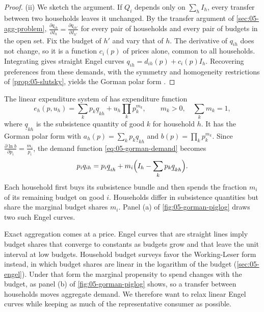 \begin{proof}
(ii) We sketch the argument. If $Q_i$ depends only on $\sum_h I_h$, every transfer between two
households leaves it unchanged. By the transfer argument of \cref{sec:05-agg-problem},
$\frac{\partial q_{ih}}{\partial I_h} = \frac{\partial q_{ih'}}{\partial I_{h'}}$ for every pair of
households and every pair of budgets in the open set. Fix the budget of $h'$ and vary that of $h$. The
derivative of $q_{ih}$ does not change, so it is a function $c_i(p)$ of prices alone, common to all
households. Integrating gives straight Engel curves $q_{ih} = d_{ih}(p) + c_i(p) I_h$. Recovering
preferences from these demands, with the symmetry and homogeneity restrictions of
\cref{prop:05-slutsky}, yields the Gorman polar form \citep{Gorman1961}.
\end{proof}

\begin{example}\label{ex:05-les}
The linear expenditure system of \citet{Stone1954} has expenditure function
\begin{equation*}
  e_h(p, u_h) = \sum_k p_k \underline{q}_{kh} + u_h \prod_k p_k^{m_k},
  \qquad m_k > 0, \quad \sum_k m_k = 1 ,
\end{equation*}
where $\underline{q}_{kh}$ is the subsistence quantity of good $k$ for household $h$. It has the Gorman
polar form with $a_h(p) = \sum_k p_k\underline{q}_{kh}$ and $b(p) = \prod_k p_k^{m_k}$. Since
$\frac{\partial \ln b}{\partial p_i} = \frac{m_i}{p_i}$, the demand function \eqref{eq:05-gorman-demand}
becomes
\begin{equation*}
  p_i q_{ih} = p_i \underline{q}_{ih} + m_i\Bigl(I_h - \sum_k p_k \underline{q}_{kh}\Bigr).
\end{equation*}
Each household first buys its subsistence bundle and then spends the fraction $m_i$ of its remaining
budget on good $i$. Households differ in subsistence quantities but share the marginal budget shares
$m_i$. Panel (a) of \cref{fig:05-gorman-piglog} draws two such Engel curves.
\end{example}

Exact aggregation comes at a price. Engel curves that are straight lines imply budget shares that
converge to constants as budgets grow and that leave the unit interval at low budgets. Household budget
surveys favor the Working-Leser form instead, in which budget shares are linear in the logarithm of the
budget (\cref{sec:05-engel}). Under that form the marginal propensity to spend changes with the budget,
as panel (b) of \cref{fig:05-gorman-piglog} shows, so a transfer between households moves aggregate
demand. We therefore want to relax linear Engel curves while keeping as much of the representative
consumer as possible.

